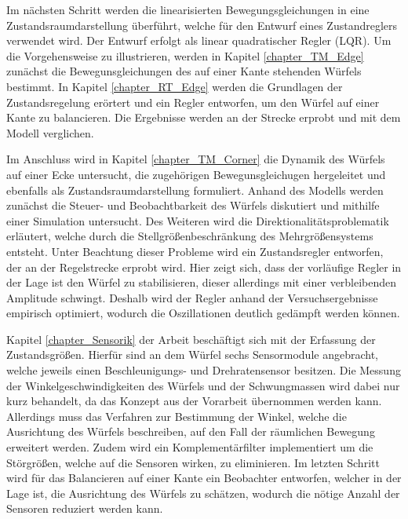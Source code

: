 Im nächsten Schritt werden die linearisierten Bewegungsgleichungen in eine Zustandsraumdarstellung überführt, welche für den Entwurf eines Zustandreglers verwendet wird. Der Entwurf erfolgt als linear quadratischer Regler (LQR). Um die Vorgehensweise zu illustrieren, werden in  Kapitel \ref{chapter_TM_Edge} zunächst die Bewegunsgleichungen des auf einer Kante stehenden Würfels bestimmt. In Kapitel \ref{chapter_RT_Edge} werden die Grundlagen der Zustandsregelung erörtert und ein Regler entworfen, um den Würfel auf einer Kante zu balancieren. Die Ergebnisse werden an der Strecke erprobt und mit dem Modell verglichen.

Im Anschluss wird in Kapitel \ref{chapter_TM_Corner} die Dynamik des Würfels auf einer Ecke untersucht, die zugehörigen Bewegunsgleichugen hergeleitet und ebenfalls als Zustandsraumdarstellung formuliert. Anhand des Modells werden zunächst die Steuer- und Beobachtbarkeit des Würfels diskutiert und mithilfe einer Simulation untersucht. Des Weiteren wird die Direktionalitätsproblematik erläutert, welche durch die Stellgrößenbeschränkung des Mehrgrößensystems entsteht. Unter Beachtung dieser Probleme wird ein Zustandsregler entworfen, der an der Regelstrecke erprobt wird. Hier zeigt sich, dass der vorläufige Regler in der Lage ist den Würfel zu stabilisieren, dieser allerdings mit einer verbleibenden Amplitude schwingt. Deshalb wird der Regler anhand der Versuchsergebnisse empirisch optimiert, wodurch die Oszillationen deutlich gedämpft werden können.

Kapitel \ref{chapter_Sensorik} der Arbeit beschäftigt sich mit der Erfassung der Zustandsgrößen. Hierfür sind an dem Würfel sechs Sensormodule angebracht, welche jeweils einen Beschleunigungs- und Drehratensensor besitzen. Die Messung der Winkelgeschwindigkeiten des Würfels und der Schwungmassen wird dabei nur kurz behandelt, da das Konzept aus der Vorarbeit übernommen werden kann. Allerdings muss das Verfahren zur Bestimmung der Winkel, welche die Ausrichtung des Würfels beschreiben, auf den Fall der räumlichen Bewegung erweitert werden. Zudem wird ein Komplementärfilter implementiert um die Störgrößen, welche auf die Sensoren wirken, zu eliminieren. Im letzten Schritt wird für das Balancieren auf einer Kante ein Beobachter entworfen, welcher in der Lage ist, die Ausrichtung des Würfels zu schätzen, wodurch die nötige Anzahl der Sensoren reduziert werden kann.

